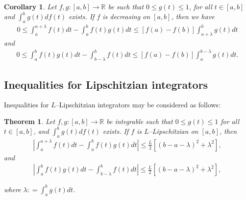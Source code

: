 \documentclass{amsart}
\newtheorem{theorem}{Theorem}
\theoremstyle{plain}
\newtheorem{corollary}{Corollary}
\numberwithin{equation}{section}
\begin{document}
\begin{corollary}
Let $f,g: [a,b] \to \mathbb{R}$ be such that $0 \le g(t) \le 1$,
for all $t \in [a,b]$ and $\int_a^b {g\left( t \right)df\left( t
\right)}$  exists. If $f$ is decreasing on $[a,b]$, then we have
\begin{align}
\label{eq2.6} 0 \le \int_a^{a + \lambda } {f\left( t \right)dt} -
\int_a^b {f\left( t \right)g\left( t \right)dt}  \le \left[
{f\left( a \right) - f\left( b \right)} \right]\int_{a + \lambda
}^b {g\left( t \right)dt}
\end{align}
and
\begin{align}
\label{eq2.7} 0 \le \int_a^b {f\left( t \right)g\left( t
\right)dt}  - \int_{b - \lambda }^b {f\left( t \right)dt}  \le
\left[ {f\left( a \right) - f\left( b \right)} \right]\int_a^{b -
\lambda } {g\left( t \right)dt}.
\end{align}
\end{corollary}

\subsection{Inequalities for Lipschitzian integrators}

Inequalities for $L$--Lipschitzian integrators may be considered
as follows:
\begin{theorem}
\label{thm.L}Let $f,g : [a,b] \to \mathbb{R}$ be integrable such
that $0 \le g(t) \le 1$ for all $t \in [a,b]$, and $\int_a^b
{g\left( t \right)df\left( t \right)}$ exists. If $f$ is
$L$--Lipschitzian on $[a,b]$, then
\begin{align}
\label{eq2.8}\left| {\int_a^{a + \lambda } {f\left( t \right)dt} -
\int_a^b {f\left( t \right)g\left( t \right)dt} } \right| \le
\frac{L}{2}\left[ {\left( {b - a - \lambda } \right)^2  + \lambda
^2 } \right],
\end{align}
and
\begin{align}
\label{eq2.9}\left| {\int_a^b {f\left( t \right)g\left( t
\right)dt} -  \int_{b - \lambda }^b {f\left( t \right)dt}} \right|
\le \frac{L}{2}\left[ {\left( {b - a - \lambda } \right)^2  +
\lambda ^2 } \right],
\end{align}

where $\lambda : = \int_a^b {g\left( t \right)dt}$.
\end{theorem}
\end{document}
